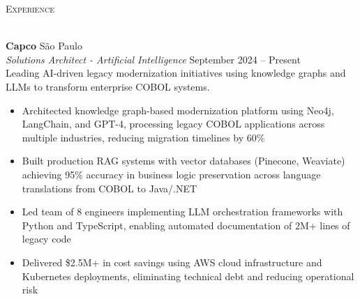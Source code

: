 \documentclass[a4paper]{article}
\newcommand{\lineunder} {
    \vspace*{-8pt} \\
    \hspace*{-18pt} \hrulefill \\
}
\newcommand{\header} [1] {
    {\hspace*{-18pt}\vspace*{6pt} \textsc{#1}}
    \vspace*{-6pt} \lineunder
}
\begin{document}
\header{Experience}
\vspace{0.5mm}

\textbf{Capco}                                                      \hfill São Paulo              \\
\textit{Solutions Architect - Artificial Intelligence}               \hfill September 2024 – Present    \\
\vspace{0.5mm}
Leading AI-driven legacy modernization initiatives using knowledge graphs and LLMs to transform enterprise COBOL systems.
\vspace{-2mm}
\begin{itemize}
\setlength\itemsep{-1mm}
\item Architected knowledge graph-based modernization platform using Neo4j, LangChain, and GPT-4, processing legacy COBOL applications across multiple industries, reducing migration timelines by 60\%
\item Built production RAG systems with vector databases (Pinecone, Weaviate) achieving 95\% accuracy in business logic preservation across language translations from COBOL to Java/.NET
\item Led team of 8 engineers implementing LLM orchestration frameworks with Python and TypeScript, enabling automated documentation of 2M+ lines of legacy code
\item Delivered \$2.5M+ in cost savings using AWS cloud infrastructure and Kubernetes deployments, eliminating technical debt and reducing operational risk
\end{itemize}
\vspace{0.5mm}
\end{document}
